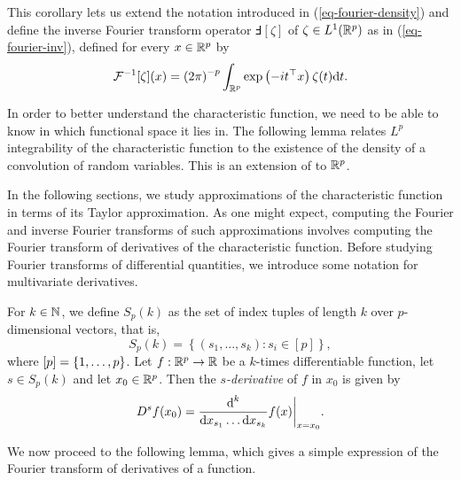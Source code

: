 This corollary lets us extend the notation introduced in (\ref{eq-fourier-density}) and define the inverse Fourier transform operator $\Finv[\zeta]$ of $\zeta \in L^1({\mathbb{R}^p})$ as in (\ref{eq-fourier-inv}), defined for every $x \in {\mathbb{R}^p}$ by
\begin{equation*}
    {\mathcal{F}^{-1}}[\zeta](x) = \left(2\pi\right)^{-p}\int_{\mathbb{R}^p} \exp\left(-i t^\top x\right) \zeta(t) \text{d} t.
\end{equation*}

In order to better understand the characteristic function, we need to be able to know in which functional space it lies in. The following lemma relates $L^p$ integrability of the characteristic function to the existence of the density of a convolution of random variables. This is an extension of \cite[Lemma 2.4.4]{kolassa2006series} to ${\mathbb{R}^p}$.



In the following sections, we study approximations of the characteristic function in terms of its Taylor approximation. As one might expect, computing the Fourier and inverse Fourier transforms of such approximations involves computing the Fourier transform of derivatives of the characteristic function. Before studying Fourier transforms of differential quantities, we introduce some notation for multivariate derivatives.

For $k \in \mathbb{N}$, we define $S_p(k)$ as the set of index tuples of length $k$ over $p$-dimensional vectors, that is,
\begin{equation*}
    S_p(k) = \left\{ (s_1, \ldots, s_k) : s_i \in [p] \right\},
\end{equation*}
where $[p] = {\left\{1, \ldots, p\right\}}$. Let $f : {\mathbb{R}^p} \rightarrow \mathbb{R}$ be a $k$-times differentiable function, let $s \in S_p(k)$ and let $x_0 \in {\mathbb{R}^p}$. Then the \textit{$s$-derivative} of $f$ in $x_0$ is given by
\begin{equation*}
    D^s f(x_0) = \frac{\text{d}^k}{\text{d} x_{s_1} \ldots \text{d} x_{s_k}} f(x) \bigg|_{x=x_0}.
\end{equation*}

We now proceed to the following lemma, which gives a simple expression of the Fourier transform of derivatives of a function.

